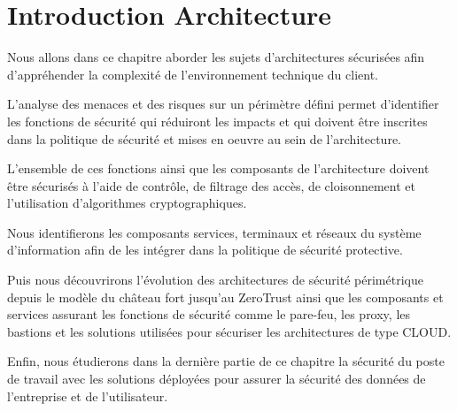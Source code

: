 \section{Introduction Architecture}
Nous allons dans ce chapitre aborder les sujets d'architectures sécurisées afin d'appréhender la complexité de l'environnement technique du client.

L'analyse des menaces et des risques sur un périmètre défini permet d'identifier les fonctions de sécurité qui réduiront les impacts et qui doivent être inscrites dans la politique de sécurité et mises en oeuvre au sein de l'architecture.

L'ensemble de ces fonctions ainsi que les composants de l'architecture doivent être sécurisés à l'aide de contrôle, de filtrage des accès, de cloisonnement et l'utilisation d'algorithmes cryptographiques.

Nous identifierons les composants services, terminaux et réseaux du système d'information afin de les intégrer dans la politique de sécurité protective.

Puis nous découvrirons l'évolution des architectures de sécurité périmétrique depuis le modèle du château fort jusqu'au ZeroTrust ainsi que les composants et services assurant les fonctions de sécurité comme le pare-feu, les proxy, les bastions et les solutions utilisées pour sécuriser les architectures de type CLOUD.

Enfin, nous étudierons dans la dernière partie de ce chapitre la sécurité du poste de travail avec les solutions déployées pour assurer la sécurité des données de l'entreprise et de l'utilisateur.





